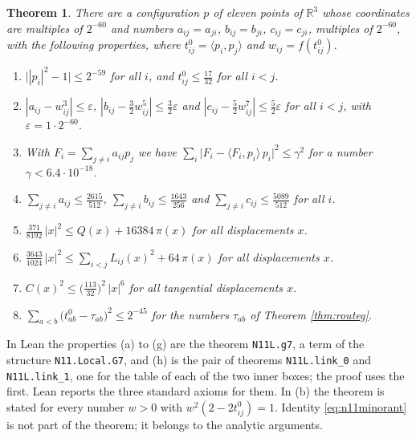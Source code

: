 \documentclass[reqno,a4paper,11pt]{amsart}
\numberwithin{equation}{section}
\newtheorem{theorem}{Theorem}[section]
\def\R{{\mathbb R}}
\newcommand{\lean}[1]{\texttt{#1}}
\newcommand{\factNrlEncE}{1}
\newcommand{\factNrlGammaUp}{6.4 \cdot 10^{-18}}
\newcommand{\factNrlLinkBits}{45}
\newcommand{\factNrlNormBits}{59}
\newcommand{\factNrlRowADen}{512}
\newcommand{\factNrlRowANum}{2615}
\newcommand{\factNrlRowBDen}{256}
\newcommand{\factNrlRowBNum}{1643}
\newcommand{\factNrlRowCDen}{512}
\newcommand{\factNrlRowCNum}{5089}
\begin{document}
\begin{theorem}\label{thm:gseven}
There are a configuration $p$ of eleven points of $\R^3$ whose coordinates are multiples of $2^{-60}$ and numbers $a_{ij} = a_{ji}$, $b_{ij} = b_{ji}$, $c_{ij} = c_{ji}$, multiples of $2^{-60}$, with the following properties, where $t^0_{ij} = \langle p_i, p_j \rangle$ and $w_{ij} = f(t^0_{ij})$.
\begin{enumerate}
    \item[(a)] $\bigl| |p_i|^2 - 1 \bigr| \leq 2^{-\factNrlNormBits}$ for all $i$, and $t^0_{ij} \leq \tfrac{17}{32}$ for all $i < j$.
    \item[(b)] $|a_{ij} - w_{ij}^3| \leq \varepsilon$, $|b_{ij} - \tfrac32 w_{ij}^5| \leq \tfrac32 \varepsilon$ and $|c_{ij} - \tfrac52 w_{ij}^7| \leq \tfrac52 \varepsilon$ for all $i < j$, with $\varepsilon = \factNrlEncE \cdot 2^{-60}$.
    \item[(c)] With $F_i = \sum_{j \neq i} a_{ij} p_j$ we have $\sum_i \bigl| F_i - \langle F_i, p_i \rangle \, p_i \bigr|^2 \leq \gamma^2$ for a number $\gamma < \factNrlGammaUp$.
    \item[(d)] $\sum_{j \neq i} a_{ij} \leq \tfrac{\factNrlRowANum}{\factNrlRowADen}$, $\sum_{j \neq i} b_{ij} \leq \tfrac{\factNrlRowBNum}{\factNrlRowBDen}$ and $\sum_{j \neq i} c_{ij} \leq \tfrac{\factNrlRowCNum}{\factNrlRowCDen}$ for all $i$.
    \item[(e)] $\tfrac{371}{8192} \, |x|^2 \leq Q(x) + 16384 \, \pi(x)$ for all displacements $x$.
    \item[(f)] $\tfrac{3643}{1024} \, |x|^2 \leq \sum_{i<j} L_{ij}(x)^2 + 64 \, \pi(x)$ for all displacements $x$.
    \item[(g)] $C(x)^2 \leq \bigl( \tfrac{113}{32} \bigr)^2 \, |x|^6$ for all tangential displacements $x$.
    \item[(h)] $\sum_{a<b} \bigl( t^0_{ab} - \tau_{ab} \bigr)^2 \leq 2^{-\factNrlLinkBits}$ for the numbers $\tau_{ab}$ of Theorem \ref{thm:routeg}.
\end{enumerate}
\end{theorem}

In Lean the properties (a) to (g) are the theorem \lean{N11L.g7}, a term of the structure \lean{N11.Local.G7}, and (h) is the pair of theorems \lean{N11L.link\_0} and \lean{N11L.link\_1}, one for the table of each of the two inner boxes; the proof uses the first. Lean reports the three standard axioms for them. In (b) the theorem is stated for every number $w > 0$ with $w^2 (2 - 2 t^0_{ij}) = 1$. Identity \eqref{eq:n11minorant} is not part of the theorem; it belongs to the analytic arguments.
\end{document}
